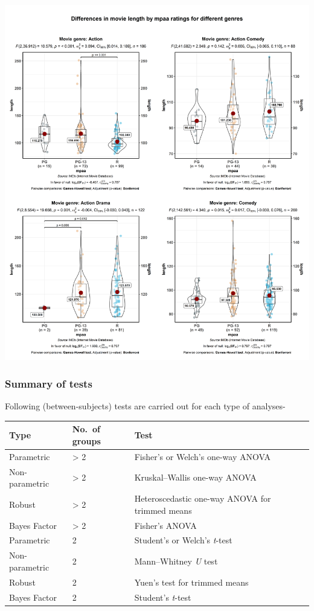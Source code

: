 \documentclass[]{article}
\begin{document}
\includegraphics[width=1\linewidth]{./figures/paper-ggbetweenstats3-1}

\hypertarget{summary-of-tests}{%
\subsubsection{Summary of tests}\label{summary-of-tests}}

Following (between-subjects) tests are carried out for each type of
analyses-

\begin{longtable}[]{@{}lll@{}}
\toprule
Type & No.~of groups & Test\tabularnewline
\midrule
\endhead
Parametric & \textgreater{} 2 & Fisher's or Welch's one-way
ANOVA\tabularnewline
Non-parametric & \textgreater{} 2 & Kruskal--Wallis one-way
ANOVA\tabularnewline
Robust & \textgreater{} 2 & Heteroscedastic one-way ANOVA for trimmed
means\tabularnewline
Bayes Factor & \textgreater{} 2 & Fisher's ANOVA\tabularnewline
Parametric & 2 & Student's or Welch's \emph{t}-test\tabularnewline
Non-parametric & 2 & Mann--Whitney \emph{U} test\tabularnewline
Robust & 2 & Yuen's test for trimmed means\tabularnewline
Bayes Factor & 2 & Student's \emph{t}-test\tabularnewline
\bottomrule
\end{longtable}
\end{document}
